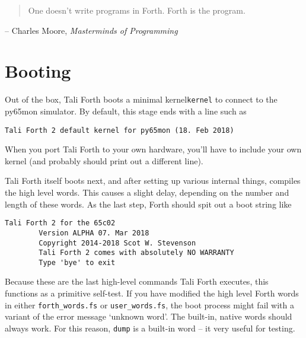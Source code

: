
\begin{quote}
	One doesn't write programs in Forth. Forth is the program.
\end{quote}
\begin{flushright}
        -- Charles Moore, \textit{Masterminds of Programming}\cite{biancuzzi09}
\end{flushright}


\section{Booting}

Out of the box, Tali Forth boots a minimal kernel\texttt{kernel}
to connect to the py65mon simulator. By default, this stage ends
with a line such as

\begin{lstlisting}[frame=lines]
        Tali Forth 2 default kernel for py65mon (18. Feb 2018)
\end{lstlisting}

When you port Tali Forth to your own hardware, you'll have to include your own
kernel (and probably should print out a different line).

\noindent Tali Forth itself boots next, and after setting up various internal
things, compiles the high level words. This causes a slight delay, depending on
the number and length of these words. As the last step, Forth should spit out a
boot string like

\begin{lstlisting}[frame=lines]
        Tali Forth 2 for the 65c02
        Version ALPHA 07. Mar 2018 
        Copyright 2014-2018 Scot W. Stevenson
        Tali Forth 2 comes with absolutely NO WARRANTY
        Type 'bye' to exit
\end{lstlisting}

\noindent Because these are the last high-level commands Tali Forth executes,
this functions as a primitive self-test. If you have modified the high level
Forth words in either \texttt{forth\_words.fs} or
\texttt{user\_words.fs}, the boot process might fail with a variant of the error
message `unknown word'. The built-in, native words should always work. For this
reason, \texttt{dump} is a built-in word -- it very
useful for testing.



